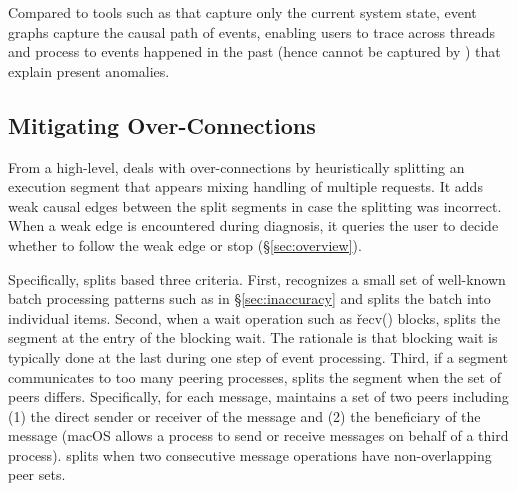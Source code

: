 Compared to tools such as  that capture only the current
system state, event graphs capture the causal path of events, enabling
users to trace across threads and process to events happened in the past
(hence cannot be captured by ) that explain present
anomalies.



\subsection{Mitigating Over-Connections}\label{subsec:fix-over}

From a high-level, \xxx deals with over-connections by heuristically
splitting an execution segment that appears mixing handling of multiple
requests.  It adds weak causal edges between the split segments in case
the splitting was incorrect.  When a weak edge is encountered during
diagnosis, it queries the user to decide whether to follow the weak edge
or stop (\S\ref{sec:overview}).

Specifically, \xxx splits based three criteria.  First, \xxx recognizes a
small set of well-known batch processing patterns such as
 in \S\ref{sec:inaccuracy} and splits the
batch into individual items.  Second, when a wait operation such as
\v{recv()} blocks, \xxx splits the segment at the entry of the blocking
wait.  The rationale is that blocking wait is typically done at the last
during one step of event processing.  Third, if a segment communicates to
too many peering processes, \xxx splits the segment when the set of peers
differs.  Specifically, for each message, \xxx maintains a set of two
peers including (1) the direct sender or receiver of the message and (2)
the beneficiary of the message (macOS allows a process to send or receive
messages on behalf of a third process).  \xxx splits when two consecutive
message operations have non-overlapping peer sets.

